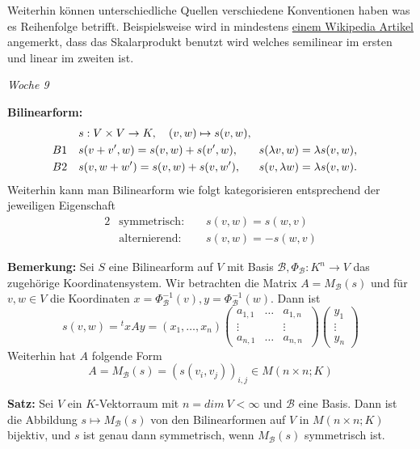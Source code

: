 \documentclass{article}
\begin{document}
Weiterhin können unterschiedliche Quellen verschiedene Konventionen haben was
es Reihenfolge betrifft. Beispielsweise wird in mindestens
\href{https://de.wikipedia.org/wiki/Gram-Schmidtsches_Orthogonalisierungsverfahren
}{einem Wikipedia Artikel} angemerkt, dass das Skalarprodukt benutzt wird
welches semilinear im ersten und linear im zweiten ist.

\textit{\small \hspace{-1.5cm}Woche 9}

\textbf{Bilinearform:} 
\begin{alignat*}{2}
	&\mathrlap{s:V\times V\to K,\quad(v,w)\mapsto s(v,w),}\\
	B1\quad&s(v+v',w)=s(v,w)+s(v',w),\quad && s(\lambda v,w)=\lambda
	s(v,w),\\
	B2\quad&s(v,w+w')=s(v,w)+s(v,w'),&& s(v,\lambda w)=\lambda s(v,w).
\end{alignat*}
Weiterhin kann man Bilinearform wie folgt kategorisieren entsprechend der
jeweiligen Eigenschaft
\begin{alignat*}{2}
	&\text{symmetrisch:  } &&s(v,w) = s(w,v)\\
	&\text{alternierend:  } &&s(v,w) = -s(w,v)
\end{alignat*}

\textbf{Bemerkung:} Sei $S$ eine Bilinearform auf $V$ mit Basis
$\mathcal{B},\Phi_\mathcal{B}:K^n\to V$ das zugehörige Koordinatensystem. Wir
betrachten die Matrix $A=M_\mathcal{B}(s)$ und für $v,w\in V$ die Koordinaten
$x=\Phi_\mathcal{B}^{-1}(v),y=\Phi_\mathcal{B}^{-1}(w)$. Dann ist
\begin{equation*}
	s(v,w)={^tx}Ay=(x_1,\dots,x_n)
	\begin{pmatrix}
		a_{1,1}&\dots &a_{1,n}\\
		\vdots & & \vdots\\
		a_{n,1}&\dots &a_{n,n}\
	\end{pmatrix}
	\begin{pmatrix}
		y_1\\ \vdots\\ y_n
	\end{pmatrix}
\end{equation*}
Weiterhin hat $A$ folgende Form
\begin{equation*}
	A=M_\mathcal{B}(s)=(s(v_i,v_j))_{i,j}\in M(n\times n;K)
\end{equation*}

\textbf{Satz:} Sei $V$ ein $K$-Vektorraum mit $n=dim\ V<\infty$ und
$\mathcal{B}$ eine Basis. Dann ist die Abbildung $s\mapsto M_\mathcal{B}(s)$
von den Bilinearformen auf $V$ in $M(n\times n; K)$ bijektiv, und $s$ ist genau
dann symmetrisch, wenn $M_\mathcal{B}(s)$ symmetrisch ist.
\end{document}
